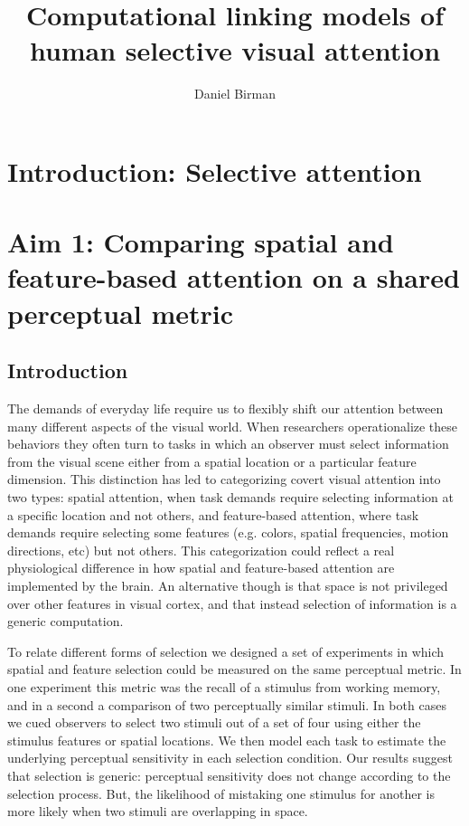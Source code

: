 \documentclass{report}
\begin{document}
\title{Computational linking models of\\human selective visual attention}
\author{Daniel Birman}

\beforepreface
{}

 


% 

\afterpreface

\chapter[Introduction]{Introduction: Selective attention}



\chapter[Comparing spatial and feature-based attention]{Aim 1: Comparing spatial and feature-based attention on a shared perceptual metric}

\section{Introduction}

The demands of everyday life require us to flexibly shift our attention between many different aspects of the visual world. When researchers operationalize these behaviors they often turn to tasks in which an observer must select information from the visual scene either from a spatial location or a particular feature dimension. This distinction has led to categorizing covert visual attention into two types: spatial attention, when task demands require selecting information at a specific location and not others, and feature-based attention, where task demands require selecting some features (e.g. colors, spatial frequencies, motion directions, etc) but not others. This categorization could reflect a real physiological difference in how spatial and feature-based attention are implemented by the brain. An alternative though is that space is not privileged over other features in visual cortex, and that instead selection of information is a generic computation.

To relate different forms of selection we designed a set of experiments in which spatial and feature selection could be measured on the same perceptual metric. In one experiment this metric was the recall of a stimulus from working memory, and in a second a comparison of two perceptually similar stimuli. In both cases we cued observers to select two stimuli out of a set of four using either the stimulus features or spatial locations. We then model each task to estimate the underlying perceptual sensitivity in each selection condition. Our results suggest that selection is generic: perceptual sensitivity does not change according to the selection process. But, the likelihood of mistaking one stimulus for another is more likely when two stimuli are overlapping in space.
\end{document}
